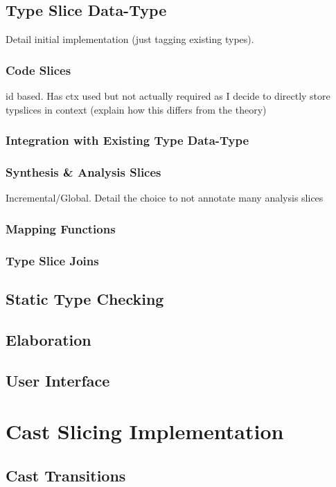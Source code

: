 \subsection{Type Slice Data-Type}\label{sec:TypeSliceDataType}
Detail initial implementation (just tagging existing types).
\subsubsection{Code Slices}\label{sec:CodeSlices}
id based. Has ctx used but not actually required as I decide to directly store typslices in context (explain how this differs from the theory)
\subsubsection{Integration with Existing Type Data-Type}
\subsubsection{Synthesis \& Analysis Slices}
Incremental/Global. Detail the choice to not annotate many analysis slices
\subsubsection{Mapping Functions}
\subsubsection{Type Slice Joins}

\subsection{Static Type Checking}\label{sec:TypeChecking}


\subsection{Elaboration}\label{sec:Elaboration}


\subsection{User Interface}

\section{Cast Slicing Implementation}\label{sec:CastSlicingImplementation}
\subsection{Cast Transitions}

